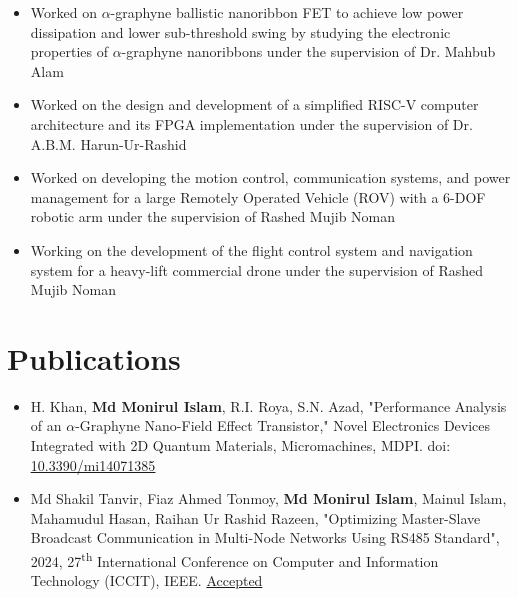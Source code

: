 \documentclass[a4paper,20pt]{article}
\begin{document}
\begin{itemize}[leftmargin=*]
    \nonindent \item Worked on \(\alpha\)-graphyne ballistic nanoribbon FET to achieve low power dissipation and lower sub-threshold swing by studying the electronic properties of \(\alpha\)-graphyne nanoribbons under the supervision of Dr. Mahbub Alam
    \vspace{-5pt}
    \nonindent \item Worked on the design and development of a simplified RISC-V computer architecture and its FPGA implementation under the supervision of Dr. A.B.M. Harun-Ur-Rashid
    \vspace{-5pt}
    \nonindent \item Worked on developing the motion control, communication systems, and power management for a large Remotely Operated Vehicle (ROV) with a 6-DOF robotic arm under the supervision of Rashed Mujib Noman
    \vspace{-5pt}
    \nonindent \item Working on the development of the flight control system and navigation system for a heavy-lift commercial drone under the supervision of Rashed Mujib Noman

    \end{itemize}  
\section{\textbf{Publications}}
\begin{itemize}[leftmargin=*]
\nonindent \item  H. Khan, \textbf{Md Monirul Islam}, R.I. Roya, S.N. Azad, "Performance Analysis of an \(\alpha\)-Graphyne Nano-Field Effect Transistor," Novel Electronics Devices Integrated with 2D Quantum Materials, Micromachines, MDPI. doi: \href{https://doi.org/10.3390/mi14071385}{\underline{10.3390/mi14071385}}
\nonindent \item  Md Shakil Tanvir, Fiaz Ahmed Tonmoy, \textbf{Md Monirul Islam}, Mainul Islam, Mahamudul Hasan, Raihan Ur Rashid Razeen, "Optimizing Master-Slave Broadcast
Communication in Multi-Node Networks Using
RS485 Standard", 2024, 27\textsuperscript{th} International Conference on Computer and Information Technology (ICCIT), IEEE. {\underline{Accepted}}
\vspace{-1pt}
 
\end{itemize}
\vspace{-5pt}
\end{document}
